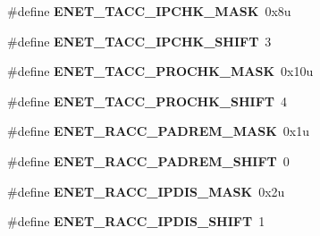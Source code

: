 \begin{DoxyCompactItemize}
\item 
\hypertarget{group___e_n_e_t___register___masks_gae79332fd3040e628268621a4525f8ce1}{}\#define {\bfseries E\+N\+E\+T\+\_\+\+T\+A\+C\+C\+\_\+\+I\+P\+C\+H\+K\+\_\+\+M\+A\+S\+K}~0x8u\label{group___e_n_e_t___register___masks_gae79332fd3040e628268621a4525f8ce1}

\item 
\hypertarget{group___e_n_e_t___register___masks_gaf007c15a11d87397188a6d940575309f}{}\#define {\bfseries E\+N\+E\+T\+\_\+\+T\+A\+C\+C\+\_\+\+I\+P\+C\+H\+K\+\_\+\+S\+H\+I\+F\+T}~3\label{group___e_n_e_t___register___masks_gaf007c15a11d87397188a6d940575309f}

\item 
\hypertarget{group___e_n_e_t___register___masks_gad5d647fe5be39e4571d94f84415f4613}{}\#define {\bfseries E\+N\+E\+T\+\_\+\+T\+A\+C\+C\+\_\+\+P\+R\+O\+C\+H\+K\+\_\+\+M\+A\+S\+K}~0x10u\label{group___e_n_e_t___register___masks_gad5d647fe5be39e4571d94f84415f4613}

\item 
\hypertarget{group___e_n_e_t___register___masks_ga1ab45d57f4375fd64bc08ca9cb53341b}{}\#define {\bfseries E\+N\+E\+T\+\_\+\+T\+A\+C\+C\+\_\+\+P\+R\+O\+C\+H\+K\+\_\+\+S\+H\+I\+F\+T}~4\label{group___e_n_e_t___register___masks_ga1ab45d57f4375fd64bc08ca9cb53341b}

\item 
\hypertarget{group___e_n_e_t___register___masks_gafe0e825e683582136a9e9c723b59119a}{}\#define {\bfseries E\+N\+E\+T\+\_\+\+R\+A\+C\+C\+\_\+\+P\+A\+D\+R\+E\+M\+\_\+\+M\+A\+S\+K}~0x1u\label{group___e_n_e_t___register___masks_gafe0e825e683582136a9e9c723b59119a}

\item 
\hypertarget{group___e_n_e_t___register___masks_gad53cc0a7d4324a869efd43688f6bb88e}{}\#define {\bfseries E\+N\+E\+T\+\_\+\+R\+A\+C\+C\+\_\+\+P\+A\+D\+R\+E\+M\+\_\+\+S\+H\+I\+F\+T}~0\label{group___e_n_e_t___register___masks_gad53cc0a7d4324a869efd43688f6bb88e}

\item 
\hypertarget{group___e_n_e_t___register___masks_gaa80ccc3df7b2b157efa6363fa2cbb66f}{}\#define {\bfseries E\+N\+E\+T\+\_\+\+R\+A\+C\+C\+\_\+\+I\+P\+D\+I\+S\+\_\+\+M\+A\+S\+K}~0x2u\label{group___e_n_e_t___register___masks_gaa80ccc3df7b2b157efa6363fa2cbb66f}

\item 
\hypertarget{group___e_n_e_t___register___masks_gacdb8d85ecbbc4e98709f880277fd4e3c}{}\#define {\bfseries E\+N\+E\+T\+\_\+\+R\+A\+C\+C\+\_\+\+I\+P\+D\+I\+S\+\_\+\+S\+H\+I\+F\+T}~1\label{group___e_n_e_t___register___masks_gacdb8d85ecbbc4e98709f880277fd4e3c}


\end{DoxyCompactItemize}

